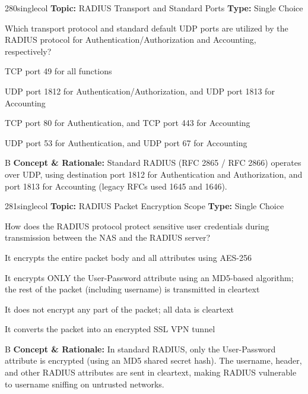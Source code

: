 \begin{qcard}{280}{singlecol}
\textcolor{darkslate!75}{\small\textbf{Topic:} RADIUS Transport and Standard Ports \hfill \textbf{Type:} Single Choice}\vspace{0.4em}\par
Which transport protocol and standard default UDP ports are utilized by the RADIUS protocol for Authentication/Authorization and Accounting, respectively?
\begin{qoptions}
\item TCP port 49 for all functions
\item UDP port 1812 for Authentication/Authorization, and UDP port 1813 for Accounting
\item TCP port 80 for Authentication, and TCP port 443 for Accounting
\item UDP port 53 for Authentication, and UDP port 67 for Accounting
\end{qoptions}
\end{qcard}
\nopagebreak
\begin{explainbox}{B}
\textbf{Concept \& Rationale:} Standard RADIUS (RFC 2865 / RFC 2866) operates over UDP, using destination port 1812 for Authentication and Authorization, and port 1813 for Accounting (legacy RFCs used 1645 and 1646).
\end{explainbox}

\begin{qcard}{281}{singlecol}
\textcolor{darkslate!75}{\small\textbf{Topic:} RADIUS Packet Encryption Scope \hfill \textbf{Type:} Single Choice}\vspace{0.4em}\par
How does the RADIUS protocol protect sensitive user credentials during transmission between the NAS and the RADIUS server?
\begin{qoptions}
\item It encrypts the entire packet body and all attributes using AES-256
\item It encrypts ONLY the User-Password attribute using an MD5-based algorithm; the rest of the packet (including username) is transmitted in cleartext
\item It does not encrypt any part of the packet; all data is cleartext
\item It converts the packet into an encrypted SSL VPN tunnel
\end{qoptions}
\end{qcard}
\nopagebreak
\begin{explainbox}{B}
\textbf{Concept \& Rationale:} In standard RADIUS, only the User-Password attribute is encrypted (using an MD5 shared secret hash). The username, header, and other RADIUS attributes are sent in cleartext, making RADIUS vulnerable to username sniffing on untrusted networks.
\end{explainbox}

